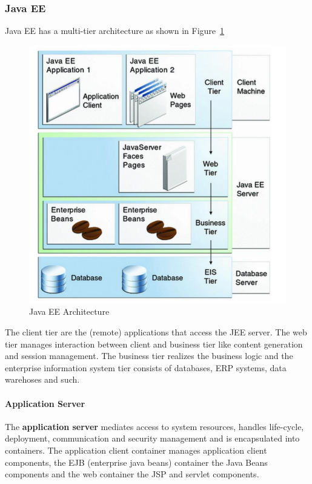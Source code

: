 \subsubsection{Java EE}
Java EE has a multi-tier architecture as shown in Figure~\ref{fig:java_ee}
\begin{figure}[h]
  \centering
  \includegraphics[width=.6\textwidth]{images/java_ee.png}
  \caption{Java EE Architecture}\label{fig:java_ee}
\end{figure}
The client tier are the (remote) applications that access the JEE server.
The web tier manages interaction between client and business tier like content generation and session management.
The business tier realizes the business logic and the enterprise information system tier consists of databases, ERP systems, data warehoses and such.\\

\paragraph{Application Server}
The \textbf{application server} mediates access to system resources, handles life-cycle, deployment, communication and security management and is encapsulated into containers.
The application client container manages application client components, the EJB (enterprise java beans) container the Java Beans components and the web container the JSP and servlet components.\\

